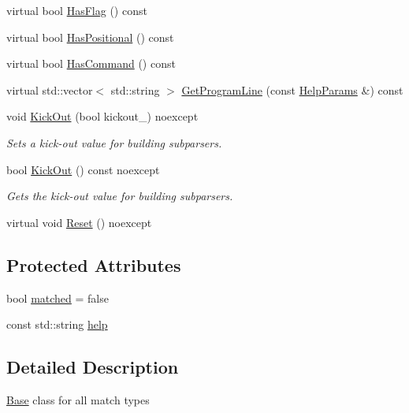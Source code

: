 \begin{DoxyCompactItemize}
\item 
virtual bool \hyperlink{classargs_1_1_base_a81684f399665c0372439c070af5de4a7}{Has\+Flag} () const
\item 
virtual bool \hyperlink{classargs_1_1_base_a3825f4afe867335438103a0d45ced9f7}{Has\+Positional} () const
\item 
virtual bool \hyperlink{classargs_1_1_base_a78322109f31edba4bb467d73e6663422}{Has\+Command} () const
\item 
virtual std\+::vector$<$ std\+::string $>$ \hyperlink{classargs_1_1_base_a88fcbbc4bfe3b7af9fafe6e96a19f337}{Get\+Program\+Line} (const \hyperlink{structargs_1_1_help_params}{Help\+Params} \&) const
\item 
void \hyperlink{classargs_1_1_base_a2a1d655c5d36c58fd19ca30d927d85b8}{Kick\+Out} (bool kickout\+\_\+) noexcept
\begin{DoxyCompactList}\small\item\em Sets a kick-\/out value for building subparsers. \end{DoxyCompactList}\item 
bool \hyperlink{classargs_1_1_base_a83a630e1e05295ab6d2610d2a68082b6}{Kick\+Out} () const noexcept
\begin{DoxyCompactList}\small\item\em Gets the kick-\/out value for building subparsers. \end{DoxyCompactList}\item 
virtual void \hyperlink{classargs_1_1_base_ac7cfc851174f71e00173121d3013dab1}{Reset} () noexcept
\end{DoxyCompactItemize}
\subsection*{Protected Attributes}
\begin{DoxyCompactItemize}
\item 
bool \hyperlink{classargs_1_1_base_a8af1b95de08c309b60c3784a70b65bf1}{matched} = false
\item 
const std\+::string \hyperlink{classargs_1_1_base_a9cdbbcdfa8e764c25f94dfe2c99c3b24}{help}
\end{DoxyCompactItemize}


\subsection{Detailed Description}
\hyperlink{classargs_1_1_base}{Base} class for all match types 

